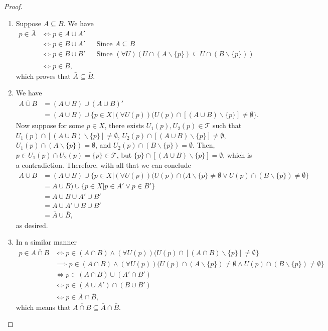 \documentclass[12pt,a4paper]{article}
\theoremstyle{theorem}
\theoremstyle{definition}
\newcommand{\Tau}{\mathcal{T}}
\begin{document}
\begin{proof}
\begin{enumerate}
\item Suppose $A \subseteq B$. We have
\begin{align*}
p \in \bar{A} &\iff p \in A \cup A' \\
&\iff p \in B \cup A' &&\text{Since }A \subseteq B\\
&\iff p \in B \cup B' &&\text{Since }(\forall U)(U \cap (A \backslash \{p \}) \subseteq  U \cap (B \backslash \{p \}))\\
&\iff p \in \bar{B} \text{,}
\end{align*}
which proves that $\bar{A} \subseteq \bar{B}$.
\item We have
\begin{align*}
\overline{A \cup B} &= (A \cup B) \cup (A \cup B)'\\
&= (A \cup B) \cup \{p \in X | (\forall U(p))(U(p) \cap [(A \cup B)\backslash \{ p\}] \not = \emptyset \}.
\end{align*}
Now suppose for some $p \in X$,  there exists $U_1(p), U_2(p) \in \Tau$ such that $U_1(p) \cap [(A \cup B)\backslash \{ p\}] \not = \emptyset$,  $U_2(p) \cap [(A \cup B)\backslash \{ p\}] \not = \emptyset$,  $U_1(p) \cap (A \backslash \{ p\}) = \emptyset$,  and $U_2(p) \cap (B \backslash \{ p\}) = \emptyset$. Then, $p \in U_1(p) \cap U_2(p) = \{p\} \in \Tau$, but $\{p \} \cap [(A \cup B)\backslash \{ p\}]  = \emptyset$, which is a contradiction. Therefore, with all that we can conclude
\begin{align*}
\overline{A \cup B} &= (A \cup B) \cup \{p \in X | (\forall U(p))(U(p) \cap (A\backslash \{ p\} \not = \emptyset \lor U(p) \cap (B\backslash \{ p\}) \not = \emptyset \}\\
&= A \cup B) \cup \{p \in X | p \in A' \lor p \in B' \}\\
&= A \cup B \cup A' \cup B'\\
&= A \cup A' \cup B \cup B'\\
&= \bar{A} \cup \bar{B} \text{,}
\end{align*}
as desired.
\item In a similar manner
\begin{align*}
p \in \overline{A \cap B} &\iff p \in (A \cap B) \land  (\forall U(p))(U(p) \cap [(A \cap B)\backslash \{ p\}] \not = \emptyset \}\\
&\implies p \in (A \cap B) \land  (\forall U(p))(U(p) \cap (A \backslash \{ p\}) \not = \emptyset \land U(p) \cap (B \backslash \{ p\}) \not = \emptyset \}\\
&\iff p \in (A \cap B) \cup (A' \cap B')\\
&\iff p \in (A \cup A') \cap (B \cup B')\\
&\iff p \in \bar{A} \cap \bar{B} \text{,}
\end{align*}
which means that $\overline{A \cap B} \subseteq \bar{A} \cap \bar{B}$.
\end{enumerate}
\end{proof}
\end{document}
